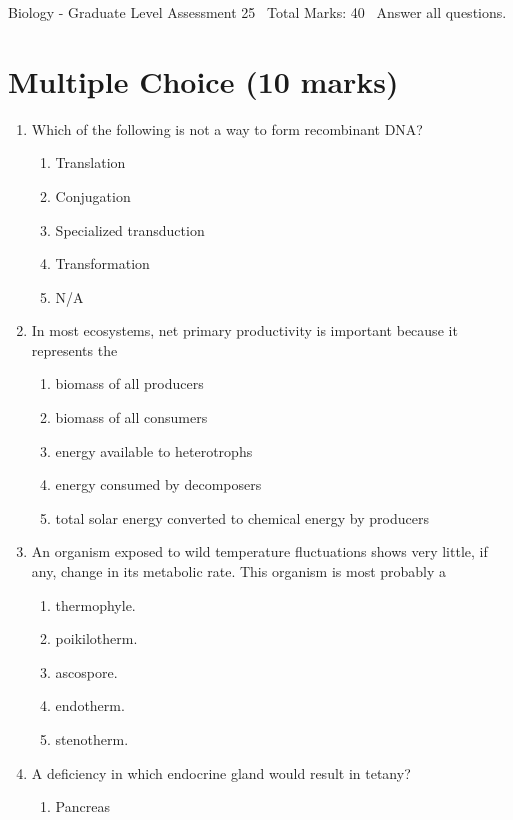 \documentclass[12pt]{article}
\begin{document}
\begin{center}
Biology - Graduate Level Assessment 25 \
Total Marks: 40 \
Answer all questions.
\end{center}

\section*{Multiple Choice (10 marks)}
\begin{enumerate}[label=\arabic*.]
\item Which of the following is not a way to form recombinant DNA?
\begin{enumerate}[label=(\alph*)]
    \item Translation
    \item Conjugation
    \item Specialized transduction
    \item Transformation
    \item N/A
\end{enumerate}
\item In most ecosystems, net primary productivity is important because it represents the
\begin{enumerate}[label=(\alph*)]
    \item biomass of all producers
    \item biomass of all consumers
    \item energy available to heterotrophs
    \item energy consumed by decomposers
    \item total solar energy converted to chemical energy by producers
\end{enumerate}
\item An organism exposed to wild temperature fluctuations shows very little, if any, change in its metabolic rate. This organism is most probably a
\begin{enumerate}[label=(\alph*)]
    \item thermophyle.
    \item poikilotherm.
    \item ascospore.
    \item endotherm.
    \item stenotherm.
\end{enumerate}
\item A deficiency in which endocrine gland would result in tetany?
\begin{enumerate}[label=(\alph*)]
    \item Pancreas

\end{enumerate}
\end{enumerate}
\end{document}
